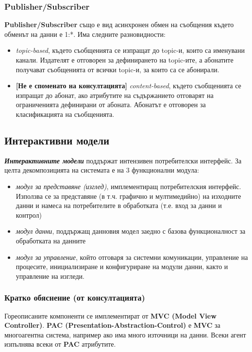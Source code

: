 \documentclass[fleqn,12pt]{article}
\begin{document}
\subsubsection{Publisher/Subscriber}
\textbf{Publisher/Subscriber} също е вид асинхронен обмен на съобщения където обменът на данни е 1:*.
Има следните разновидности:
\begin{itemize}
    \item \textit{topic-based}, където съобщенията се изпращат до topic-и, които са именувани канали.
    Издателят е отговорен за дефинирането на topic-ите, а абонатите получават съобщенията от всички topic-и, за които са се абонирали.
    \item \textbf{[Не е споменато на консултацията]} \textit{content-based}, където съобщенията се изпращат до абонат, ако атрибутите на съдържанието отговарят на ограниченията дефинирани от абоната.
    Абонатът е отговорен за класификацията на съобщенията.
\end{itemize}

\subsection{Интерактивни модели}

\textbf{\textit{Интерактивните модели}} поддържат интензивен потребителски интерфейс.
За целта декомпозицията на системата е на 3 функционални модула:
\begin{itemize}
    \item \textit{модул за представяне (изглед)}, имплементиращ потребителския интерфейс.
    Използва се за представяне (в т.ч. графично и мултимедийно) на изходните данни и намеса на потребителите в обработката (т.е. вход за данни и контрол)
    \item \textit{модул данни}, поддържащ данновия модел заедно с базова функционалност за обработката на данните
    \item \textit{модул за управление}, който отговаря за системни комуникации, управление на процесите, инициализиране и конфигуриране на модули данни, както и управление на изгледи.
\end{itemize}

\subsubsection{Кратко обяснение (от консултацията)}
Гореописаните компоненти се имплементират от \textbf{MVC (Model View Controller)}. 
\textbf{PAC (Presentation-Abstraction-Control)} е \textbf{MVC} за многоагентна система, например 
ако има много източници на данни. Всеки агент изпълнява всеки от \textbf{PAC} атрибутите.
\end{document}
